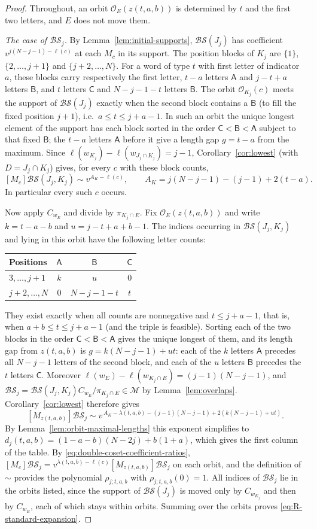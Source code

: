 \documentclass[11pt,a4paper,reqno]{amsart}
\numberwithin{equation}{section}
\theoremstyle{definition}
\theoremstyle{remark}
\theoremstyle{plain}
\newcommand{\M}{\mathcal M}
\newcommand{\A}{\mathsf A}
\newcommand{\B}{\mathsf B}
\newcommand{\CC}{\mathsf C}
\newcommand{\D}{\mathcal {BS}}
\newcommand{\R}{\mathcal {BS}}
\begin{document}
\begin{proof}
Throughout, an orbit $\mathcal O_E(z(t,a,b))$ is determined by $t$ and the first two letters, and
$E$ does not move them.

\emph{The case of $\R_j$.} By Lemma~\ref{lem:initial-supports}, $\D(J_j)$ has coefficient
$v^{j(N-j-1)-\ell(c)}$ at each $M_c$ in its support. The position blocks of $K_j$ are $\{1\}$, $\{2,\ldots,j+1\}$ and
$\{j+2,\ldots,N\}$. For a word of type $t$ with first letter of indicator $a$, these blocks carry respectively the
first letter, $t-a$ letters $\A$ and $j-t+a$ letters $\B$, and $t$ letters $\CC$ and $N-j-1-t$ letters $\B$. The orbit
$\mathcal O_{K_j}(c)$ meets the support of $\D(J_j)$ exactly when the second block contains a $\B$ (to fill the fixed
position $j+1$), i.e.\ $a\leq t\leq j+a-1$. In such an orbit the unique longest element of the support has each block sorted in
the order $\CC<\B<\A$ subject to that fixed $\B$; the $t-a$ letters $\A$ before it give a length gap $g=t-a$ from the maximum.
Since $\ell(w_{K_j})-\ell(w_{J_j\cap K_j})=j-1$, Corollary~\ref{cor:lowest} (with $D=J_j\cap K_j$) gives, for every $c$ with
these block counts,
\[
 [M_c]\D(J_j,K_j)\sim v^{A_K-\ell(c)},\qquad A_K=j(N-j-1)-(j-1)+2(t-a).
\]
In particular every such $c$ occurs.

Now apply $C_{w_E}$ and divide by $\pi_{K_j\cap E}$. Fix $\mathcal O_E(z(t,a,b))$ and write $k=t-a-b$ and $u=j-t+a+b-1$. The indices
occurring in $\D(J_j,K_j)$ and lying in this orbit have the following letter counts:
\begin{center}
\begin{tabular}{@{}lccc@{}}
\toprule
Positions & $\A$ & $\B$ & $\CC$\\\midrule
$3,\ldots,j+1$ & $k$ & $u$ & $0$\\
$j+2,\ldots,N$ & $0$ & $N-j-1-t$ & $t$\\\bottomrule
\end{tabular}
\end{center}
They exist exactly when all counts are nonnegative and $t\leq j+a-1$, that is, when $a+b\leq t\leq j+a-1$ (and the triple
is feasible). Sorting each of the two blocks in the order $\CC<\B<\A$ gives the unique longest of them, and its length gap from
$z(t,a,b)$ is $g=k(N-j-1)+ut$: each of the $k$ letters $\A$ precedes all $N-j-1$ letters of the second block, and each of the $u$ letters
$\B$ precedes the $t$ letters $\CC$. Moreover $\ell(w_E)-\ell(w_{K_j\cap E})=(j-1)(N-j-1)$, and
$\R_j=\D(J_j,K_j)C_{w_E}/\pi_{K_j\cap E}\in\M$ by Lemma~\ref{lem:overlaps}. Corollary~\ref{cor:lowest} therefore gives
\[
 [M_{z(t,a,b)}]\R_j\sim v^{\,A_K-\lambda(t,a,b)-(j-1)(N-j-1)+2(k(N-j-1)+ut)} .
\]
By Lemma~\ref{lem:orbit-maximal-lengths} this exponent simplifies to $d_j(t,a,b)=(1-a-b)(N-2j)+b(1+a)$, which gives the first column of the table.
By \eqref{eq:double-coset-coefficient-ratios}, $[M_c]\R_j=v^{\lambda(t,a,b)-\ell(c)}[M_{z(t,a,b)}]\R_j$ on each orbit, and the definition of $\sim$ provides
the polynomial $\rho_{j;t,a,b}$ with $\rho_{j;t,a,b}(0)=1$. All indices of $\R_j$ lie in the orbits listed, since the support of
$\D(J_j)$ is moved only by $C_{w_{K_j}}$ and then by $C_{w_E}$, each of which stays within orbits.
Summing over the orbits proves \eqref{eq:R-standard-expansion}.


\end{proof}
\end{document}
